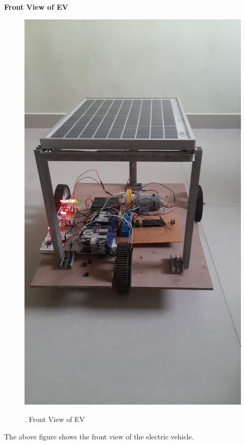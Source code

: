 \documentclass[a4paper,12pt]{article}
\begin{document}
\newpage
\textbf{Front View of EV}\\[1cm]
\begin{figure}[!h]
\centering
\includegraphics[scale=0.3]{fv.jpeg}\\
\caption{. Front View of EV}
\end{figure}

The above figure shows the front view of the electric vehicle.
\end{document}
